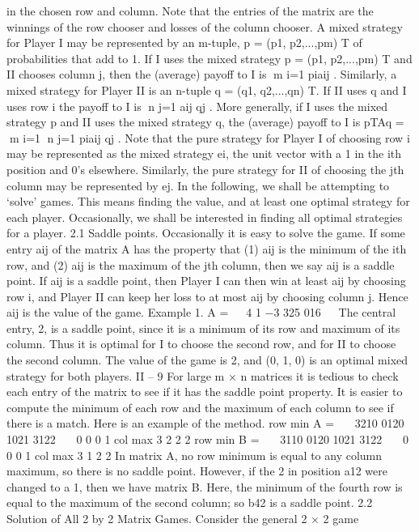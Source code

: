 in the chosen row and column. Note that the entries of the matrix are the winnings of the
row chooser and losses of the column chooser.
A mixed strategy for Player I may be represented by an m-tuple, p = (p1, p2,...,pm)
T
of probabilities that add to 1. If I uses the mixed strategy p = (p1, p2,...,pm)
T and II
chooses column j, then the (average) payoff to I is m
i=1 piaij . Similarly, a mixed strategy
for Player II is an n-tuple q = (q1, q2,...,qn)
T. If II uses q and I uses row i the payoff
to I is n
j=1 aij qj . More generally, if I uses the mixed strategy p and II uses the mixed
strategy q, the (average) payoff to I is pTAq = m
i=1
n
j=1 piaij qj .
Note that the pure strategy for Player I of choosing row i may be represented as the
mixed strategy ei, the unit vector with a 1 in the ith position and 0’s elsewhere. Similarly,
the pure strategy for II of choosing the jth column may be represented by ej. In the
following, we shall be attempting to ‘solve’ games. This means finding the value, and at
least one optimal strategy for each player. Occasionally, we shall be interested in finding
all optimal strategies for a player.
2.1 Saddle points. Occasionally it is easy to solve the game. If some entry aij of
the matrix A has the property that
(1) aij is the minimum of the ith row, and
(2) aij is the maximum of the jth column,
then we say aij is a saddle point. If aij is a saddle point, then Player I can then win at
least aij by choosing row i, and Player II can keep her loss to at most aij by choosing
column j. Hence aij is the value of the game.
Example 1.
A =
⎛
⎝
4 1 −3
325
016
⎞
⎠
The central entry, 2, is a saddle point, since it is a minimum of its row and maximum
of its column. Thus it is optimal for I to choose the second row, and for II to choose the
second column. The value of the game is 2, and (0, 1, 0) is an optimal mixed strategy for
both players.
II – 9
For large m × n matrices it is tedious to check each entry of the matrix to see if it
has the saddle point property. It is easier to compute the minimum of each row and the
maximum of each column to see if there is a match. Here is an example of the method.
row min
A =
⎛
⎜⎝
3210
0120
1021
3122
⎞
⎟⎠
0
0
0
1
col max 3 2 2 2
row min
B =
⎛
⎜⎝
3110
0120
1021
3122
⎞
⎟⎠
0
0
0
1
col max 3 1 2 2
In matrix A, no row minimum is equal to any column maximum, so there is no saddle
point. However, if the 2 in position a12 were changed to a 1, then we have matrix B. Here,
the minimum of the fourth row is equal to the maximum of the second column; so b42 is a
saddle point.
2.2 Solution of All 2 by 2 Matrix Games. Consider the general 2 × 2 game
